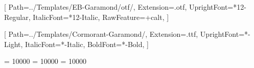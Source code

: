 
\usepackage{setspace}

\usepackage[skip=15pt plus1pt, indent=0pt]{parskip}

\setmainfont{EBGaramond}[
  Path=../Templates/EB-Garamond/otf/,
  Extension=.otf,
  UprightFont=*12-Regular,
  ItalicFont=*12-Italic,
  RawFeature=+calt,
]

\newfontfamily{}[
  Path=../Templates/Cormorant-Garamond/,
  Extension=.ttf,
  UprightFont=*-Light,
  ItalicFont=*-Italic,
  BoldFont=*-Bold,
]



\clubpenalty = 10000
\widowpenalty = 10000
\displaywidowpenalty = 10000

\newcommand{\BIG}{\fontsize{48}{48}\selectfont}

\usepackage{sectsty}
\makeatletter
\renewcommand\section{\@startsection {section}{1}{\z@}%
      {-7ex \@plus -1ex \@minus -.2ex}%
      {12ex \@plus.2ex}%
      {\newpage\vspace*{-0.5in}\begin{center}\normalfont\BIG\SS@sectfont}}
\renewcommand\subsection{\@startsection{subsection}{2}{\z@}%
      {-2.5ex\@plus -1ex \@minus -.2ex}%
      {2.5ex \@plus .2ex}%
      {\normalfont\Large\itshape\SS@subsectfont}}
\renewcommand\subsubsection{\@startsection{subsubsection}{3}{\z@}%
      {-2.5ex\@plus -1ex \@minus -.2ex}%
      {2.5ex \@plus .2ex}%
      {\cormorant\large\bfseries\SS@subsectfont}}
\makeatother

\usepackage{titling}
\pretitle{\linespread{1}\begin{center}\vspace{2cm}\Huge}


